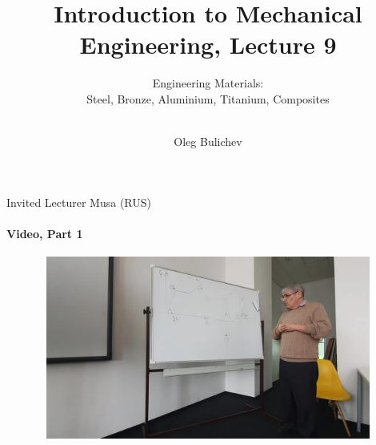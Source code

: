 \documentclass[aspectratio=169]{beamer}
\title[IME]{Introduction to Mechanical Engineering, Lecture 9} %
\subtitle{Engineering Materials:  
\\ Steel, Bronze, Aluminium, Titanium, Composites  \\   
\ } %
\author{Oleg Bulichev}
\newcommand{\fbckg}[1]{\usebackgroundtemplate{\texttt{[image: \#1]}}}%
\begin{document}
\setlength{\abovedisplayskip}{0pt}
\setlength{\belowdisplayskip}{0pt}
\setlength{\abovedisplayshortskip}{0pt}
\setlength{\belowdisplayshortskip}{0pt}

\fbckg{fibeamer/figs/title_page.png}

\fbckg{fibeamer/figs/common.png}

\note{\scriptsize \begin{itemize}
        \item \
    \end{itemize}}

    \begin{frame}[t]{Invited Lecturer Musa (RUS)}
        \framesubtitle{Video, Part 1}
        \vspace{-0.6cm}
        \begin{figure}[H]
            \href{https://disk.yandex.ru/i/pmZGYsEMQlrWTA}{
                \centering\includegraphics[height=6cm,width=1\textwidth,keepaspectratio]{musa_lec_1_video.png}}
            \label{fig:musa_lec_1_video.png}
        \end{figure}
    \end{frame}
    
\end{document}
